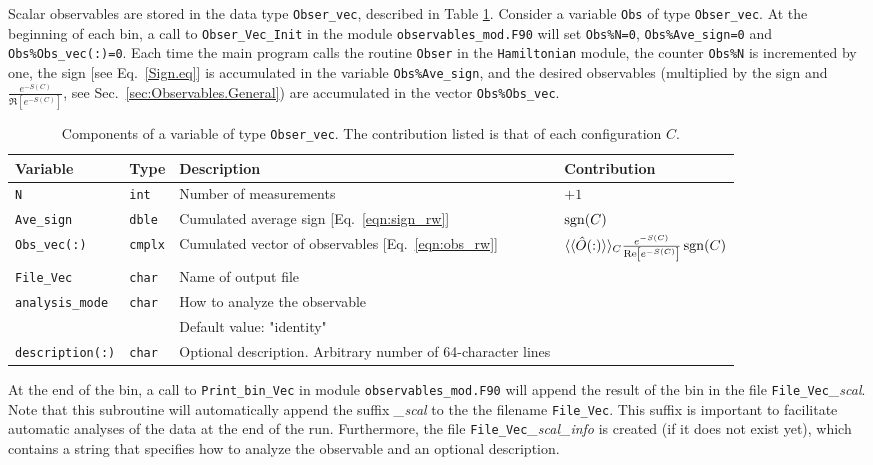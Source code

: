 Scalar observables are stored in the data type \texttt{Obser\_vec}, described in Table \ref{table:Obser_vec}. Consider  a variable \texttt{Obs} of type  \texttt{Obser\_vec}.  At the beginning of each bin,  a call to  \texttt{Obser\_Vec\_Init} in the module \texttt{observables\_mod.F90}  will  set   \texttt{Obs\%N=0},   \texttt{Obs\%Ave\_sign=0}  and  \texttt{Obs\%Obs\_vec(:)=0}.  Each time the main  program calls the routine \texttt{Obser}  in the  \texttt{Hamiltonian} module,  the counter \texttt{Obs\%N}   is incremented by one, the sign  [see Eq.~\eqref{Sign.eq}] is accumulated in the  variable \texttt{Obs\%Ave\_sign},  and the desired observables (multiplied by the sign and   $\frac{e^{-S(C)}} {\Re \left[e^{-S(C)} \right]}$, see Sec.~\ref{sec:Observables.General})  are accumulated in the vector \texttt{Obs\%Obs\_vec}.  
%
\begin{table}[h!]
	\begin{center}
   \begin{tabular}{@{} p{} @{ } p{} p{} l @{}}
   \toprule
    Variable                 &  Type          & Description &  Contribution \\
    \midrule
    \texttt{N}               & \texttt{int}   & Number of measurements &    $+1$ \\
    \texttt{Ave\_sign}       & \texttt{dble}  & Cumulated average sign [Eq.~\eqref{eqn:sign_rw}] & $\operatorname{sgn}(C)$  \\
    \texttt{Obs\_vec(:)}  	  & \texttt{cmplx} & Cumulated vector of observables [Eq.~\eqref{eqn:obs_rw}] &
           $ \langle \langle \hat{O}(:) \rangle \rangle_{C}\frac{e^{-S(C)}} {\operatorname{Re} \left[e^{-S(C)} \right]} \operatorname{sgn}(C) $ \\
     \texttt{File\_Vec}      & \texttt{char} & Name of output file  &\\
     \texttt{analysis\_mode} & \texttt{char} & How to analyze the observable &\\
                             &               & Default value: "identity" &\\
     \texttt{description(:)} & \texttt{char} & Optional description. Arbitrary number of 64-character lines &\\
     \bottomrule     
   \end{tabular}
   \caption{Components of a variable of type \texttt{Obser\_vec}. The contribution listed is that of each configuration $C$.}
         \label{table:Obser_vec}
     \end{center}
\end{table}
%
At the end of the bin, a call to \texttt{Print\_bin\_Vec} in module \texttt{observables\_mod.F90} will append the result of the bin in the file \texttt{File\_Vec}\emph{\_scal}.  Note that this subroutine will automatically append the suffix \emph{\_scal} to the the filename \texttt{File\_Vec}.
This suffix  is important to facilitate automatic analyses of the data at the end of the run.
Furthermore, the file \texttt{File\_Vec}\emph{\_scal\_info} is created (if it does not exist yet), which contains a string that specifies how to analyze the observable and an optional description.

